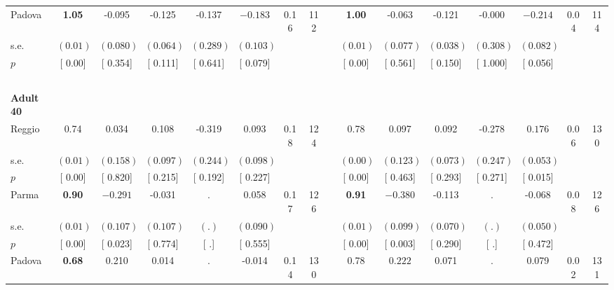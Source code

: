 \begin{longtable}{L{8em} c c c c c c c p{1em} c c c c c c c}
\quad \quad \quad Padova& \textbf{     1.05} &    -0.095 &    -0.125 &    -0.137 & $ \mathbf{   -0.183}$ &      0.16 &       112 & & \textbf{     1.00} &    -0.063 &    -0.121 &    -0.000 & $ \mathbf{   -0.214}$ &      0.04 &       114  \\*
\quad \quad \quad \quad s.e.& $ (     0.01)$ & $ (    0.080)$ & $ (    0.064)$ & $ (    0.289)$ & $ (    0.103)$ & & & & $ (     0.01)$ & $ (    0.077)$ & $ (    0.038)$ & $ (    0.308)$ & $ (    0.082)$ & &  \\*
\quad \quad \quad \quad $ p$ & [     0.00] & [    0.354] & [    0.111] & [    0.641] & [    0.079] & & & & [     0.00] & [    0.561] & [    0.150] & [    1.000] & [    0.056] & &  \\[1em]
~\\[1em]
\quad \quad \textbf{Adult 40} & & & & & & & & & & & & & & & \\* 
\quad \quad \quad Reggio& 0.74 &     0.034 &     0.108 &    -0.319 &     0.093 &      0.18 &       124 & & 0.78 &     0.097 &     0.092 &    -0.278 & $ \mathbf{    0.176}$ &      0.06 &       130  \\*
\quad \quad \quad \quad s.e.& $ (     0.01)$ & $ (    0.158)$ & $ (    0.097)$ & $ (    0.244)$ & $ (    0.098)$ & & & & $ (     0.00)$ & $ (    0.123)$ & $ (    0.073)$ & $ (    0.247)$ & $ (    0.053)$ & &  \\*
\quad \quad \quad \quad $ p$ & [     0.00] & [    0.820] & [    0.215] & [    0.192] & [    0.227] & & & & [     0.00] & [    0.463] & [    0.293] & [    0.271] & [    0.015] & &  \\[1em]
\quad \quad \quad Parma& \textbf{     0.90} & $ \mathbf{   -0.291}$ &    -0.031 &         . &     0.058 &      0.17 &       126 & & \textbf{     0.91} & $ \mathbf{   -0.380}$ &    -0.113 &         . &    -0.068 &      0.08 &       126  \\*
\quad \quad \quad \quad s.e.& $ (     0.01)$ & $ (    0.107)$ & $ (    0.107)$ & $ (        .)$ & $ (    0.090)$ & & & & $ (     0.01)$ & $ (    0.099)$ & $ (    0.070)$ & $ (        .)$ & $ (    0.050)$ & &  \\*
\quad \quad \quad \quad $ p$ & [     0.00] & [    0.023] & [    0.774] & [        .] & [    0.555] & & & & [     0.00] & [    0.003] & [    0.290] & [        .] & [    0.472] & &  \\[1em]
\quad \quad \quad Padova& \textbf{     0.68} &     0.210 &     0.014 &         . &    -0.014 &      0.14 &       130 & & 0.78 & $ \mathbf{    0.222}$ &     0.071 &         . &     0.079 &      0.02 &       131  \\*

\end{longtable}
